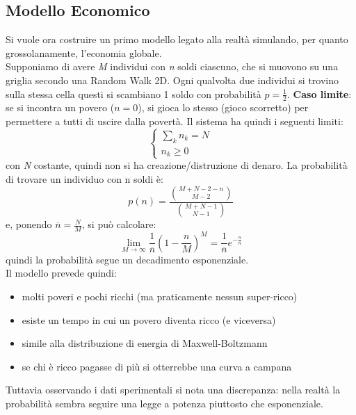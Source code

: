 \documentclass[12pt, a4paper]{article}
\theoremstyle{theorem}
\begin{document}
		\subsection{Modello Economico}
			Si vuole ora costruire un primo modello legato alla realtà simulando, per quanto grossolanamente, l'economia globale.\\
			Supponiamo di avere \textit{M} individui con \textit{n} soldi ciascuno, che si muovono su una griglia secondo una Random Walk 2D.
			Ogni qualvolta due individui si trovino sulla stessa cella questi si scambiano 1 soldo con probabilità $p=\frac{1}{2}$.
			\textbf{Caso limite}: se si incontra un povero ($n=0$), si gioca lo stesso (gioco scorretto) per permettere a tutti di uscire dalla povertà.
			Il sistema ha quindi i seguenti limiti:
			\begin{equation}
				\begin{cases}
					\sum_kn_k=N\\
					n_k\geq 0
				\end{cases}
			\end{equation}
			con \textit{N} costante, quindi non si ha creazione/distruzione di denaro.
			La probabilità di trovare un individuo con n soldi è:
			\begin{equation}
				p(n)=\frac{\binom{M+N-2-n}{M-2}}{\binom{M+N-1}{N-1}}
			\end{equation}
			e, ponendo $\overline{n}=\frac{N}{M}$, si può calcolare:
			\begin{equation}
				\lim_{M\to\infty}\frac{1}{\overline{n}}\left( 1-\frac{n}{M}\right)^M=\frac{1}{\overline{n}}e^{-\frac{n}{\bar{n}}}
			\end{equation}
			quindi la probabilità segue un decadimento esponenziale.\\
			Il modello prevede quindi:
			\begin{itemize}
				\item molti poveri e pochi ricchi (ma praticamente nessun super-ricco)
				\item esiste un tempo in cui un povero diventa ricco (e viceversa)
				\item simile alla distribuzione di energia di Maxwell-Boltzmann
				\item se chi è ricco pagasse di più si otterrebbe una curva a campana
			\end{itemize}
			Tuttavia osservando i dati sperimentali si nota una discrepanza: nella realtà la probabilità sembra seguire una legge a potenza piuttosto che esponenziale.
\end{document}
